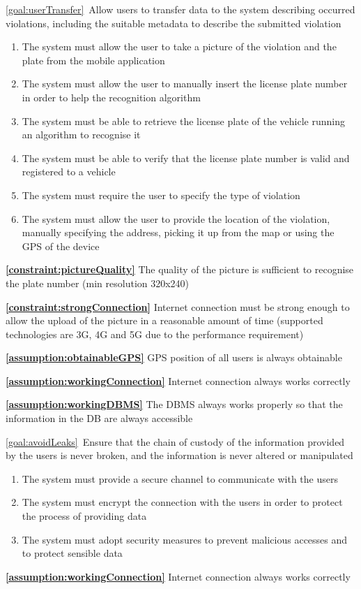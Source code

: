 \begin{description}
		\item \ref{goal:userTransfer}\ Allow users to transfer data to the system describing occurred violations, including the suitable metadata to describe the submitted violation			
			 \begin{enumerate}[resume*]
				\item The system must allow the user to take a picture of the violation and the plate from the mobile application
  				\item The system must allow the user to manually insert the license plate number in order to help the recognition algorithm
  				\item The system must be able to retrieve the license plate of the vehicle running an algorithm to recognise it
  				\item The system must be able to verify that the license plate number is valid and registered to a vehicle
  				\item The system must require the user to specify the type of violation
  				\item The system must allow the user to provide the location of the violation, manually specifying the address, picking it up from the map or using the GPS of the device
   			\end{enumerate}
   			
   			\textbf{\ref{constraint:pictureQuality}} The quality of the picture is sufficient to recognise the plate number (min resolution 320x240)
   			
			\textbf{\ref{constraint:strongConnection}} Internet connection must be strong enough to allow the upload of the picture in a reasonable amount of time (supported technologies are 3G, 4G and 5G due to the performance requirement)
			
			\textbf{\ref{assumption:obtainableGPS}} GPS position of all users is always obtainable
			
			\textbf{\ref{assumption:workingConnection}} Internet connection always works correctly
			
			\textbf{\ref{assumption:workingDBMS}} The DBMS always works properly so that the information in the DB are always accessible \newline
			
		\item \ref{goal:avoidLeaks}\ Ensure that the chain of custody of the information provided by the users is never broken, and the information is never altered or manipulated			
			\begin{enumerate}[resume*]
   				\item The system must provide a secure channel to communicate with the users
   				\item The system must encrypt the connection with the users in order to protect the process of providing data
   				\item The system must adopt security measures to prevent malicious accesses and to protect sensible data
  			\end{enumerate}
			\textbf{\ref{assumption:workingConnection}} Internet connection always works correctly \newline
			

\end{description}
